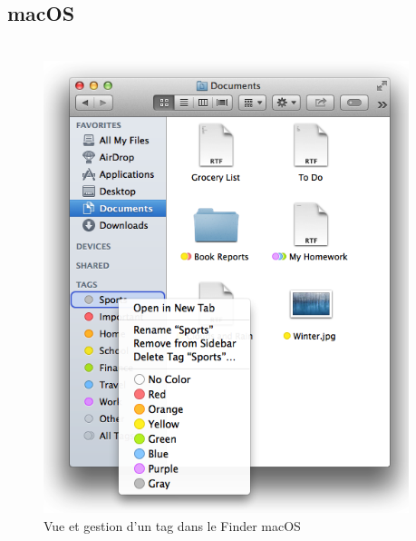 \documentclass[10pt]{beamer}
\begin{document}
\subsection{macOS}
\begin{frame}
    \frametitle{\subsecname}
    \begin{columns}[T]
        \begin{column}{.4\textwidth}
            \begin{figure}
                \begin{center}
                    \includegraphics[width=1\textwidth]{images/macos_tags.png}
                    \caption{Vue et gestion d'un tag dans le Finder macOS \cite{ref5}}
                \end{center}
            \end{figure}
        \end{column}
        \pause
        \begin{column}{.6\textwidth}
            \begin{center}
                \begin{tabularx}{6cm}{|X|X|} \hline

\end{tabularx}
\end{center}
\end{column}
\end{columns}
\end{frame}
\end{document}
